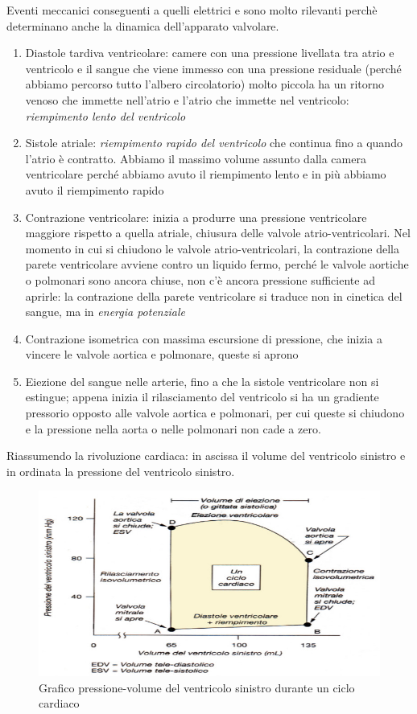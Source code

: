 \documentclass[a4paper,12pt]{article}
\begin{document}
Eventi meccanici conseguenti a quelli elettrici e sono molto rilevanti perchè determinano anche la dinamica dell'apparato valvolare. 
\begin{enumerate}
\item{Diastole tardiva ventricolare: camere con una pressione livellata tra atrio e ventricolo e il sangue che viene immesso con una pressione residuale (perché abbiamo percorso tutto l'albero circolatorio) molto piccola ha un ritorno venoso che immette nell'atrio e l'atrio che immette nel ventricolo: \emph{riempimento lento del ventricolo}}
\item{Sistole atriale: \emph{riempimento rapido del ventricolo} che continua fino a quando l'atrio è contratto. Abbiamo il massimo volume assunto dalla camera ventricolare perché abbiamo avuto il riempimento lento e in più abbiamo avuto il riempimento rapido}
\item{Contrazione ventricolare: inizia a produrre una pressione ventricolare maggiore rispetto a quella atriale, chiusura delle valvole atrio-ventricolari. Nel momento in cui si chiudono le valvole atrio-ventricolari, la contrazione della parete ventricolare avviene contro un liquido fermo, perché le valvole aortiche o polmonari sono ancora chiuse, non c'è ancora pressione sufficiente ad aprirle: la contrazione della parete ventricolare si traduce non in cinetica del sangue, ma in \emph{energia potenziale}}
\item{Contrazione isometrica con massima escursione di pressione, che inizia a vincere le valvole aortica e polmonare, queste si aprono}
\item{Eiezione del sangue nelle arterie, fino a che la sistole ventricolare non si estingue; appena inizia il rilasciamento del ventricolo si ha un gradiente pressorio opposto alle valvole aortica e polmonari, per cui queste si chiudono e la pressione nella aorta o nelle polmonari non cade a zero.}
\end{enumerate}

Riassumendo la rivoluzione cardiaca: in ascissa il volume del ventricolo sinistro e in ordinata la pressione del ventricolo sinistro. 
\begin{figure}[H]
\centering
\includegraphics[scale=0.4]{immagine/ventricoli.jpg}
\caption{Grafico pressione-volume del ventricolo sinistro durante un ciclo cardiaco}
\end{figure}
\end{document}
